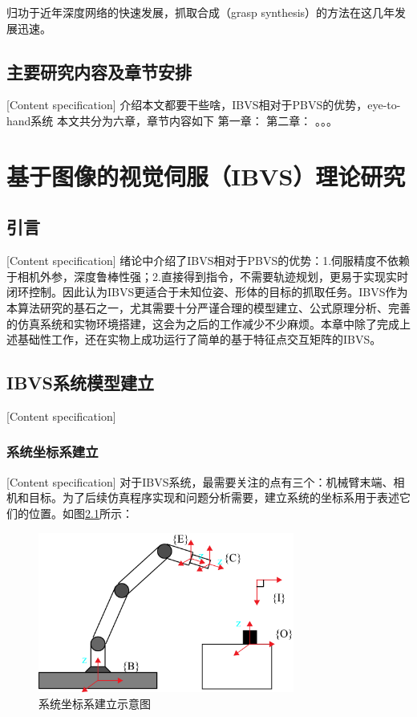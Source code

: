 \documentclass[fontset=fandol,type=bachelor,campus=harbin]{hithesisbook}
\begin{document}
归功于近年深度网络的快速发展，抓取合成（grasp synthesis）的方法在这几年发展迅速。
\section{主要研究内容及章节安排}[Content specification]
介绍本文都要干些啥，IBVS相对于PBVS的优势，eye-to-hand系统
本文共分为六章，章节内容如下  
第一章：  
第二章：  
。。。





\chapter[基于图像的视觉伺服（IBVS）理论研究]{基于图像的视觉伺服（IBVS）理论研究}
\section{引言}[Content specification]
绪论中介绍了IBVS相对于PBVS的优势：1.伺服精度不依赖于相机外参，深度鲁棒性强；2.直接得到指令，不需要轨迹规划，更易于实现实时闭环控制。因此认为IBVS更适合于未知位姿、形体的目标的抓取任务。IBVS作为本算法研究的基石之一，尤其需要十分严谨合理的模型建立、公式原理分析、完善的仿真系统和实物环境搭建，这会为之后的工作减少不少麻烦。本章中除了完成上述基础性工作，还在实物上成功运行了简单的基于特征点交互矩阵的IBVS。

\section{IBVS系统模型建立}[Content specification]
\subsection{系统坐标系建立}[Content specification]
对于IBVS系统，最需要关注的点有三个：机械臂末端、相机和目标。为了后续仿真程序实现和问题分析需要，建立系统的坐标系用于表述它们的位置。如图\ref{系统坐标系建立}所示：
\begin{figure}[h]
\centering
\includegraphics[width = 0.75\textwidth]{chapter2/系统坐标系建立}
\caption{系统坐标系建立示意图}
\label{系统坐标系建立}
\end{figure}
\end{document}
